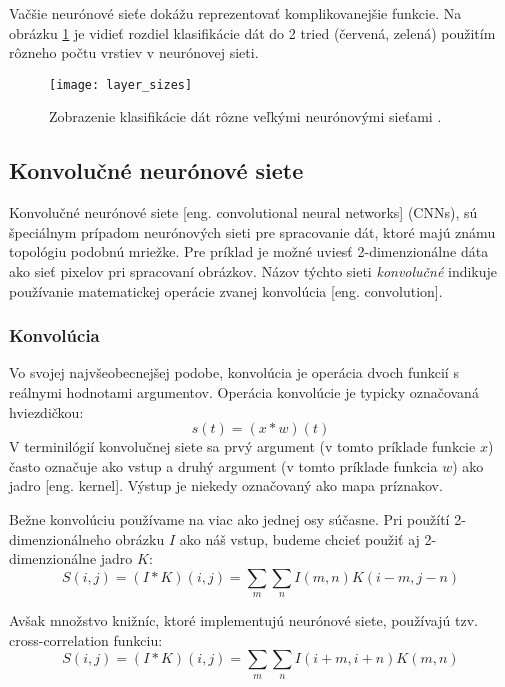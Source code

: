 Vačšie neurónové sieťe dokážu reprezentovať komplikovanejšie funkcie.
Na obrázku \ref{pic:XNNLayerExample} je vidieť rozdiel klasifikácie dát do 2 tried (červená, zelená) použitím rôzneho počtu vrstiev v neurónovej sieti.
\begin{figure}[H]
	\centering
	\texttt{[image: layer\_sizes]}
	\caption{Zobrazenie klasifikácie dát rôzne veľkými neurónovými sieťami \cite{odkaz:ConvolutionalNeuralNetworkCS231n}.}
	\label{pic:XNNLayerExample}
\end{figure}

\subsection{Konvolučné neurónové siete}
Konvolučné neurónové siete [eng. convolutional neural networks] (CNNs), sú špeciálnym prípadom neurónových sieti pre spracovanie
    dát, ktoré majú známu topológiu podobnú mriežke.
Pre príklad je možné uviesť 2-dimenzionálne dáta ako sieť pixelov pri spracovaní obrázkov.
Názov týchto sieti \textit{konvolučné} indikuje používanie matematickej operácie zvanej konvolúcia [eng. convolution]\cite{book:Goodfellow-et-al-2016}.

\subsubsection{Konvolúcia}
Vo svojej najvšeobecnejšej podobe, konvolúcia je operácia dvoch funkcií s reálnymi hodnotami argumentov.
Operácia konvolúcie je typicky označovaná hviezdičkou:
\begin{equation}
    s(t) = (x * w)(t)
\end{equation}
V terminilógií konvolučnej siete sa prvý argument (v tomto príklade funkcie $x$) často označuje ako vstup a druhý
    argument (v tomto príklade funkcia $w$) ako jadro [eng. kernel]. Výstup je niekedy označovaný ako mapa príznakov.

Bežne konvolúciu používame na viac ako jednej osy súčasne.
Pri použítí 2-dimenzionálneho obrázku $I$ ako náš vstup, budeme chcieť použiť aj 2-dimenzionálne jadro $K$\cite{book:Goodfellow-et-al-2016}:
\begin{equation}
    S(i,j) = (I * K)(i, j) = \sum_m \sum_n I(m,n) K(i - m, j - n)
\end{equation}

Avšak množstvo knižníc, ktoré implementujú neurónové siete, používajú tzv. cross-correlation funkciu\cite{book:Goodfellow-et-al-2016}:
\begin{equation}
    S(i,j) = (I * K)(i, j) = \sum_m \sum_n I(i + m, i + n) K(m, n)
\end{equation}

